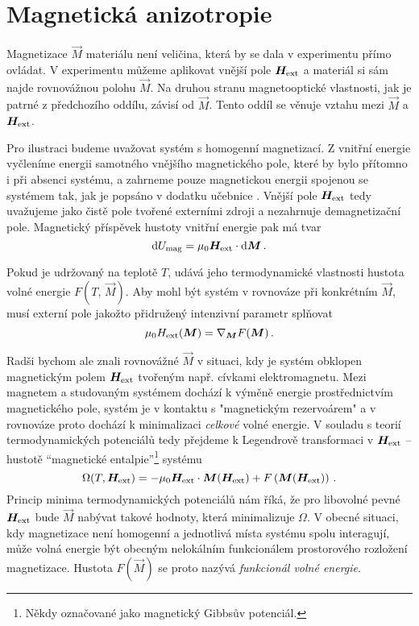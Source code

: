 \section{Magnetická anizotropie}
\label{chap:magneticka-anizotropie}

Magnetizace $\vec{M}$ materiálu není veličina, která by se dala v experimentu přímo ovládat.
V experimentu můžeme aplikovat vnější pole $\bm{H}_\textrm{ext}$ a materiál si sám najde rovnovážnou polohu $\vec{M}$.
Na druhou stranu magnetooptické vlastnosti, jak je patrné z předchozího oddílu, závisí od $\vec{M}$.
Tento oddíl se věnuje vztahu mezi $\vec{M}$ a $\bm{H}_\textrm{ext}$.

Pro ilustraci budeme uvažovat systém s homogenní magnetizací.
Z vnitřní energie vyčleníme energii samotného vnějšího magnetického pole, které by bylo přítomno i při absenci systému, a zahrneme pouze magnetickou energii spojenou se systémem tak, jak je popsáno v dodatku učebnice \cite{callenThermodynamicsIntroductionThermostatistics1985}.
Vnější pole $\bm{H}_\textrm{ext}$ tedy uvažujeme jako čistě pole tvořené externími zdroji a nezahrnuje demagnetizační pole.
Magnetický příspěvek hustoty vnitřní energie pak má tvar\cite{callenThermodynamicsIntroductionThermostatistics1985} 
\begin{equation}
    \textrm{d} U_\textrm{mag} = \mu_0 \bm{H}_\textrm{ext} \cdot \textrm{d}\bm{M}\,.
\end{equation}

Pokud je udržovaný na teplotě $T$, udává jeho termodynamické vlastnosti hustota volné energie $F(T,\,\vec{M})$\cite{callenThermodynamicsIntroductionThermostatistics1985}.
Aby mohl být systém v rovnováze při konkrétním $\vec{M}$, musí externí pole jakožto přidružený intenzivní parametr splňovat
\begin{equation} 
\label{eqn:Hext=gradF}
    \mu_0H_\textrm{ext}(\bm{M}) = \nabla_{\bm{M}} F(\bm{M}) \,.
\end{equation}

Radši bychom ale znali rovnovážné $\vec{M}$ v situaci, kdy je systém obklopen magnetickým polem $\bm{H}_\textrm{ext}$ tvořeným např. cívkami elektromagnetu.
Mezi magnetem a studovaným systémem dochází k výměně energie prostřednictvím magnetického pole, systém je v kontaktu s "magnetickým rezervoárem" a v rovnováze proto dochází k minimalizaci \emph{celkové} volné energie.
V souladu s teorií termodynamických potenciálů tedy přejdeme k Legendrově transformaci v $\bm{H}_\textrm{ext}$ -- hustotě ``magnetické entalpie''\footnote{Někdy označované jako magnetický Gibbsův potenciál.} systému\cite{castellanoThermodynamicPotentialsSimple2003}
\begin{equation} 
\label{eqn:magneticka-entalpie}
    \Omega(T,\bm{H}_\textrm{ext})= -\mu_0\bm{H}_\textrm{ext}\cdot\bm{M}(\bm{H}_\textrm{ext})+F\left(\bm{M}(\bm{H}_\textrm{ext})\right) \,.
\end{equation}
Princip minima termodynamických potenciálů nám říká, že pro libovolné pevné $\bm{H}_\textrm{ext}$ bude $\vec{M}$ nabývat takové hodnoty, která minimalizuje $\Omega$.
V obecné situaci, kdy magnetizace není homogenní a jednotlivá místa systému spolu interagují, může volná energie být obecným nelokálním funkcionálem prostorového rozložení magnetizace.
Hustota $F(\vec{M})$ se proto nazývá \emph{funkcionál volné energie}.

